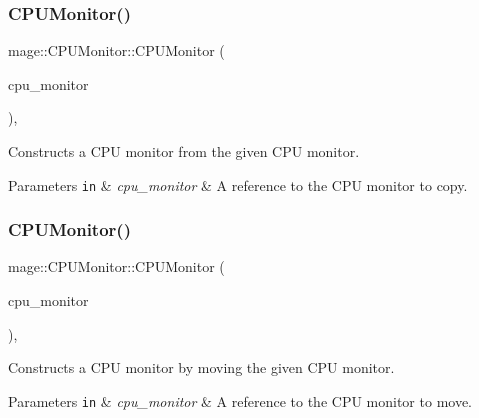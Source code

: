 \subsubsection{\texorpdfstring{C\+P\+U\+Monitor()}{CPUMonitor()}\hspace{0.1cm}{\footnotesize\ttfamily [2/3]}}
{\footnotesize\ttfamily mage\+::\+C\+P\+U\+Monitor\+::\+C\+P\+U\+Monitor (\begin{DoxyParamCaption}\item[{const \mbox{\hyperlink{classmage_1_1_c_p_u_monitor}{C\+P\+U\+Monitor}} \&}]{cpu\+\_\+monitor }\end{DoxyParamCaption})\hspace{0.3cm}{\ttfamily [default]}, {\ttfamily [noexcept]}}

Constructs a C\+PU monitor from the given C\+PU monitor.


\begin{DoxyParams}[1]{Parameters}
\mbox{\tt in}  & {\em cpu\+\_\+monitor} & A reference to the C\+PU monitor to copy. \\
\hline
\end{DoxyParams}
\mbox{\label{classmage_1_1_c_p_u_monitor_a415f77c86323428f233f955249f5b252}} 
\subsubsection{\texorpdfstring{C\+P\+U\+Monitor()}{CPUMonitor()}\hspace{0.1cm}{\footnotesize\ttfamily [3/3]}}
{\footnotesize\ttfamily mage\+::\+C\+P\+U\+Monitor\+::\+C\+P\+U\+Monitor (\begin{DoxyParamCaption}\item[{\mbox{\hyperlink{classmage_1_1_c_p_u_monitor}{C\+P\+U\+Monitor}} \&\&}]{cpu\+\_\+monitor }\end{DoxyParamCaption})\hspace{0.3cm}{\ttfamily [default]}, {\ttfamily [noexcept]}}

Constructs a C\+PU monitor by moving the given C\+PU monitor.


\begin{DoxyParams}[1]{Parameters}
\mbox{\tt in}  & {\em cpu\+\_\+monitor} & A reference to the C\+PU monitor to move. \\
\hline
\end{DoxyParams}
\mbox{\label{classmage_1_1_c_p_u_monitor_a597ea4b27675a22d3d66a1d817b26652}} 

